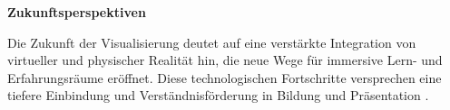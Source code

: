 \textbf{Zukunftsperspektiven}

Die Zukunft der Visualisierung deutet auf eine verstärkte Integration von virtueller und physischer Realität hin, die neue Wege für immersive Lern- und Erfahrungsräume eröffnet. Diese technologischen Fortschritte versprechen eine tiefere Einbindung und Verständnisförderung in Bildung und Präsentation \cite{Vermirovsky2010ImportanceVisualisation}.


%
%
%
%
%
%
